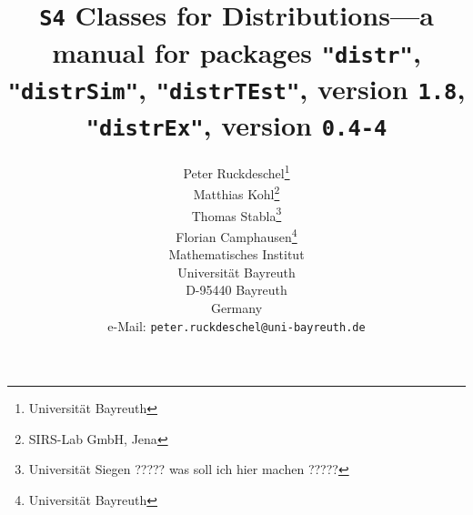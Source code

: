 \documentclass[11pt]{article}
\newcommand{\pkg}[1]{{\tt "#1"}}
\newcommand{\pkgversion}{{\tt 1.8}}
\newcommand{\pkgExversion}{{\tt 0.4-4}}
\begin{document}
\title{{\tt S4} Classes for Distributions---a manual for packages \pkg{distr}, \pkg{distrSim}, \pkg{distrTEst}, version \pkgversion,
\pkg{distrEx}, version \pkgExversion}
\author{\small Peter Ruckdeschel\thanks{Universit\"at Bayreuth}
\\[-.5ex]
\small Matthias Kohl\thanks{SIRS-Lab GmbH, Jena}
\\[-.5ex]
\small Thomas Stabla\thanks{Universit\"at Siegen ????? was soll ich hier machen ????? }
\\[-.5ex]
\small Florian Camphausen\thanks{Universit\"at Bayreuth}
\smallskip\\
\small Mathematisches Institut\\[-.5ex]
\small Universit\"at Bayreuth\\[-.5ex]
\small D-95440 Bayreuth\\[-.5ex]
\small Germany\\
\small e-Mail: {\small \tt peter.ruckdeschel@uni-bayreuth.de}\\
}
\maketitle
\end{document}
